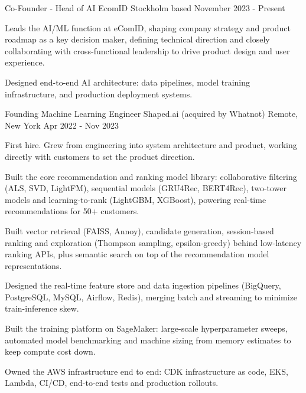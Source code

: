 

\begin{cventries}

\cventry
    {Co-Founder - Head of AI} %
    {EcomID} %
    {Stockholm based} %
    {November 2023 - Present} %
    {
        \begin{cvitems} %
        \item {Leads the AI/ML function at eComID, shaping company strategy and product roadmap as a key decision maker, defining technical direction and closely collaborating with cross-functional leadership to drive product design and user experience.}
        \item {Designed end-to-end AI architecture: data pipelines, model training infrastructure, and production deployment systems.}
        \end{cvitems}
    }

\cventry
    {Founding Machine Learning Engineer} %
    {Shaped.ai (acquired by Whatnot)} %
    {Remote, New York} %
    {Apr 2022 - Nov 2023} %
    {
        \begin{cvitems} %
        \item {First hire. Grew from engineering into system architecture and product, working directly with customers to set the product direction.}
        \item {Built the core recommendation and ranking model library: collaborative filtering (ALS, SVD, LightFM), sequential models (GRU4Rec, BERT4Rec), two-tower models and learning-to-rank (LightGBM, XGBoost), powering real-time recommendations for 50+ customers.}
        \item {Built vector retrieval (FAISS, Annoy), candidate generation, session-based ranking and exploration (Thompson sampling, epsilon-greedy) behind low-latency ranking APIs, plus semantic search on top of the recommendation model representations.}
        \item {Designed the real-time feature store and data ingestion pipelines (BigQuery, PostgreSQL, MySQL, Airflow, Redis), merging batch and streaming to minimize train-inference skew.}
        \item {Built the training platform on SageMaker: large-scale hyperparameter sweeps, automated model benchmarking and machine sizing from memory estimates to keep compute cost down.}
        \item {Owned the AWS infrastructure end to end: CDK infrastructure as code, EKS, Lambda, CI/CD, end-to-end tests and production rollouts.}
        \end{cvitems}
    }


\end{cventries}
